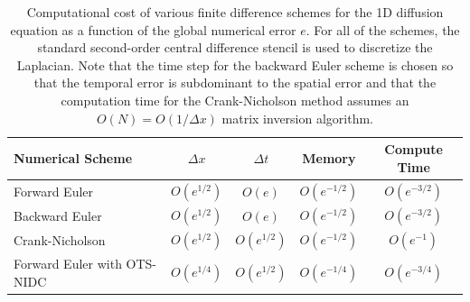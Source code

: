 \documentclass[fleqn,12pt,twoside]{article}
\def\dt{\Delta t}
\def\dx{\Delta x}
\begin{document}
\begin{table}[tb]
\caption{
Computational cost of various finite difference schemes for the 1D 
diffusion equation as a function of the global numerical error $e$.
For all of the schemes, the standard second-order central difference 
stencil is used to discretize the Laplacian.  
Note that the time step for the backward Euler scheme is chosen so that the
temporal error is subdominant to the spatial error and that the computation 
time for the Crank-Nicholson method assumes an $O(N) = O \left( 1/\dx\right)$ 
matrix inversion algorithm. 
}
\label{tab:comp_perf_vs_err} 
\renewcommand{\arraystretch}{1.5}
\centering
\begin{tabular}{lcccc}
  \hline
  {\bf Numerical Scheme} & $\dx$ 
  & $\dt$
  & {\bf Memory}
  & {\bf Compute Time}
  \\
  \hline 
  Forward Euler    & $O\left( e^{1/2} \right)$ 
                   & $O\left( e \right)$ 
                   & $O\left( e^{-1/2} \right)$ 
                   & $O\left( e^{-3/2} \right)$ \\
  Backward Euler   & $O\left( e^{1/2} \right)$ 
                   & $O\left( e \right)$ 
                   & $O\left( e^{-1/2} \right)$ 
                   & $O\left( e^{-3/2} \right)$ \\
  Crank-Nicholson  & $O\left( e^{1/2} \right)$ 
                   & $O\left( e^{1/2} \right)$ 
                   & $O\left( e^{-1/2} \right)$ 
                   & $O\left( e^{-1} \right)$ \\
  Forward Euler with OTS-NIDC  & $O\left( e^{1/4} \right)$ 
                   & $O\left( e^{1/2} \right)$ 
                   & $O\left( e^{-1/4} \right)$ 
                   & $O\left( e^{-3/4} \right)$ \\ 
  \hline
\end{tabular}
\end{table}
\end{document}
